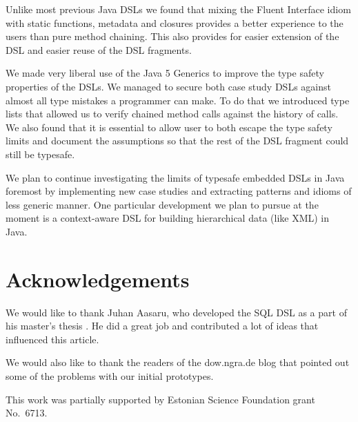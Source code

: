 \documentclass{sig-alternate}
\begin{document}
Unlike most previous Java DSLs we found that mixing the Fluent Interface idiom with static functions, metadata and closures provides a better experience to the users than pure method chaining. This also provides for easier extension of the DSL and easier reuse of the DSL fragments. 

We made very liberal use of the Java 5 Generics to improve the type safety properties of the DSLs. We managed to secure both case study DSLs against almost all type mistakes a programmer can make. To do that we introduced type lists that allowed us to verify chained method calls against the history of calls. We also found that it is essential to allow user to both escape the type safety limits and document the assumptions so that the rest of the DSL fragment could still be typesafe.

We plan to continue investigating the limits of typesafe embedded DSLs in Java foremost by implementing new case studies and extracting patterns and idioms of less generic manner. One particular development we plan to pursue at the moment is a context-aware DSL for building hierarchical data (like XML) in Java. 

\section{Acknowledgements}

We would like to thank Juhan Aasaru, who developed the SQL DSL as a part of his master's thesis \cite{aasaru2008}. He did a great job and contributed a lot of ideas that influenced this article. 

We would also like to thank the readers of the dow.ngra.de blog that pointed out some of the problems with our initial prototypes.

This work was partially supported by Estonian Science Foundation grant No.\ 6713.



\end{document}
